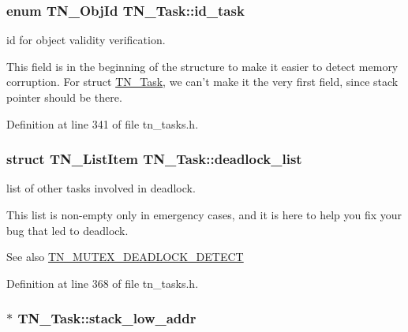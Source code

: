 \hypertarget{structTN__Task_a014a0a70ae6a23d08b1571ac6b017abd}{
\subsubsection[{id\+\_\+task}]{\setlength{\rightskip}{0pt plus 5cm}enum {\bf T\+N\+\_\+\+Obj\+Id} T\+N\+\_\+\+Task\+::id\+\_\+task}}\label{structTN__Task_a014a0a70ae6a23d08b1571ac6b017abd}


id for object validity verification. 

This field is in the beginning of the structure to make it easier to detect memory corruption. For {\ttfamily struct \hyperlink{structTN__Task}{T\+N\+\_\+\+Task}}, we can't make it the very first field, since stack pointer should be there. 

Definition at line 341 of file tn\+\_\+tasks.\+h.

\hypertarget{structTN__Task_a097e79851e01fb3c73f0346d99ea8b7e}{
\subsubsection[{deadlock\+\_\+list}]{\setlength{\rightskip}{0pt plus 5cm}struct {\bf T\+N\+\_\+\+List\+Item} T\+N\+\_\+\+Task\+::deadlock\+\_\+list}}\label{structTN__Task_a097e79851e01fb3c73f0346d99ea8b7e}


list of other tasks involved in deadlock. 

This list is non-\/empty only in emergency cases, and it is here to help you fix your bug that led to deadlock.

\begin{DoxySeeAlso}{See also}
{\ttfamily \hyperlink{tn__cfg__default_8h_a6ed3ec7b0d4338e7f60dde86b7ea5fa4}{T\+N\+\_\+\+M\+U\+T\+E\+X\+\_\+\+D\+E\+A\+D\+L\+O\+C\+K\+\_\+\+D\+E\+T\+E\+C\+T}} 
\end{DoxySeeAlso}


Definition at line 368 of file tn\+\_\+tasks.\+h.

\hypertarget{structTN__Task_a05cfde00b0cd82cda88a6698dc159e31}{
\subsubsection[{stack\+\_\+low\+\_\+addr}]{$\ast$ T\+N\+\_\+\+Task\+::stack\+\_\+low\+\_\+addr}}\label{structTN__Task_a05cfde00b0cd82cda88a6698dc159e31}


